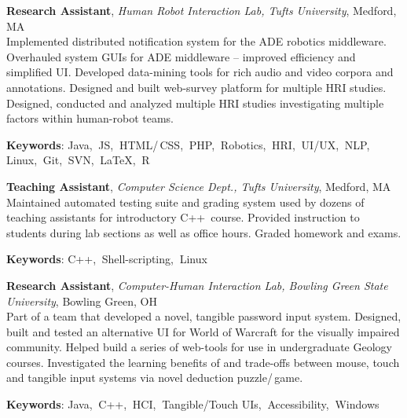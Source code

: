 \documentclass[10pt, letter]{article}
\newcommand{\years}[1]{\marginnote{\footnotesize #1}}
\newenvironment{desc*}{
  \begin{description}
    \setlength{\itemsep}{0.2pt}
    \setlength{\parskip}{-1pt}
    \setlength{\parsep}{0pt}
  }{
  \end{description}
}
\begin{document}
\vspace{-.2cm}
\years{2012 - 2014} 
\textbf{\fontsize{10.5pt}{1em}\selectfont Research Assistant}, 
\textsl{Human Robot Interaction Lab, Tufts University}, Medford, MA\\ 

\vspace{-.3cm} 
Implemented distributed notification system for the ADE robotics
middleware. Overhauled system GUIs for ADE middleware -- improved
efficiency and simplified UI. Developed data-mining tools for rich
audio and video corpora and annotations. Designed and built web-survey
platform for multiple HRI studies. Designed, conducted and analyzed
multiple HRI studies investigating multiple factors within human-robot
teams.
\vspace{-.1cm}
\begin{desc*}
\item[\rm \textbf{Keywords}:] Java,$\:$ JS,$\:$ HTML/\,CSS,$\:$ PHP,$\:$ Robotics,$\:$
  HRI,$\:$ UI/UX,$\:$ NLP,$\:$ Linux,$\:$ Git,$\:$ SVN,$\:$ \LaTeX,$\:$ R\\
\end{desc*}

\vspace{-.2cm}
\years{2012, 2013} 
\textbf{\fontsize{10.5pt}{1em}\selectfont Teaching Assistant}, 
\textsl{Computer Science Dept., Tufts University}, Medford, MA \\ 

\vspace{-.3cm}
Maintained automated testing suite and grading system used by dozens
of teaching assistants for introductory C++\, course. Provided
instruction to students during lab sections as well as office hours.
Graded homework and exams.
\vspace{-.1cm}
\begin{desc*}
\item[\rm \textbf{Keywords}:] C++,$\:$ Shell-scripting,$\:$ Linux\\
\end{desc*}

\vspace{-.2cm}
\years{2010 - 2012}
\textbf{\fontsize{10.5pt}{1em}\selectfont Research Assistant}, 
\textsl{Computer-Human Interaction Lab, Bowling Green State
  University}, Bowling Green, OH \\

\vspace{-.3cm}
Part of a team that developed a novel, tangible password input system.
Designed, built and tested an alternative UI for World of Warcraft for
the visually impaired community. Helped build a series of web-tools
for use in undergraduate Geology courses. Investigated the learning
benefits of and trade-offs between mouse, touch and tangible input
systems via novel deduction puzzle/\,game.
\vspace{-.1cm}
\begin{desc*}
\item[\rm \textbf{Keywords}:] Java,$\:$ C++,$\:$ HCI,$\:$ Tangible/Touch UIs,$\:$ Accessibility,$\:$ Windows\\
\end{desc*}
\end{document}

